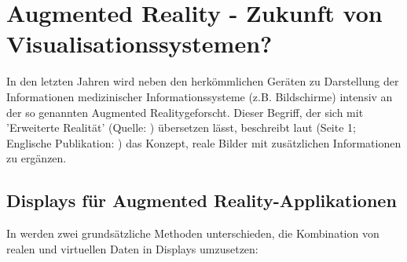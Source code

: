 \documentclass[pdftex,a4paper,titlepage,12pt]{scrartcl}
\newtheorem[L]{boxedDefinition}{Definition}
\begin{document}
\section{Augmented Reality - Zukunft von Visualisationssystemen?}\label{sec:augmentedreality}
In den letzten Jahren wird neben den herkömmlichen Geräten zu Darstellung der Informationen medizinischer Informationssysteme (z.B. Bildschirme) intensiv an der so genannten \glqq Augmented Reality\grqq geforscht. Dieser Begriff, der sich mit 'Erweiterte Realität' (Quelle: \cite[Seite 1]{Toe2010}) übersetzen lässt, beschreibt laut \cite{Suthau2002DE} (Seite 1; Englische Publikation: \cite{Suthau2002}) das Konzept, reale Bilder mit zusätzlichen Informationen zu ergänzen.

\subsection{Displays für Augmented Reality-Applikationen}\label{ssec:ardisplays}
In \cite[Kapitel 2.2, Seite 21]{Toe2010} werden zwei grundsätzliche Methoden unterschieden, die Kombination von realen und virtuellen Daten in Displays umzusetzen:
\end{document}
